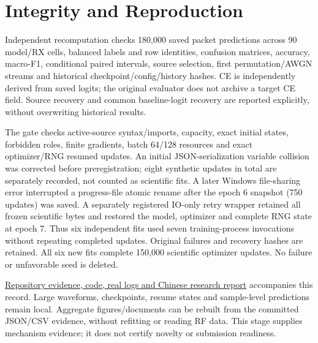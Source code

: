 \documentclass[10pt]{article}
\begin{document}
\section{Integrity and Reproduction}
Independent recomputation checks 180,000 saved packet predictions across 90 model/RX cells, balanced labels and row identities, confusion matrices, accuracy, macro-F1, conditional paired intervals, source selection, first permutation/AWGN streams and historical checkpoint/config/history hashes. CE is independently derived from saved logits; the original evaluator does not archive a target CE field. Source recovery and common baseline-logit recovery are reported explicitly, without overwriting historical results.

The gate checks active-source syntax/imports, capacity, exact initial states, forbidden roles, finite gradients, batch 64/128 resources and exact optimizer/RNG resumed updates. An initial JSON-serialization variable collision was corrected before preregistration; eight synthetic updates in total are separately recorded, not counted as scientific fits. A later Windows file-sharing error interrupted a progress-file atomic rename after the epoch 6 snapshot (750 updates) was saved. A separately registered IO-only retry wrapper retained all frozen scientific bytes and restored the model, optimizer and complete RNG state at epoch 7. Thus six independent fits used seven training-process invocations without repeating completed updates. Original failures and recovery hashes are retained. All six new fits complete 150,000 scientific optimizer updates. No failure or unfavorable seed is deleted.

\href{https://github.com/hanCChan/crossatten/tree/exp/s27-mechanism-identification/27-mechanism-identification}{Repository evidence, code, real logs and Chinese research report} accompanies this record. Large waveforms, checkpoints, resume states and sample-level predictions remain local. Aggregate figures/documents can be rebuilt from the committed JSON/CSV evidence, without refitting or reading RF data. This stage supplies mechanism evidence; it does not certify novelty or submission readiness.
\end{document}
